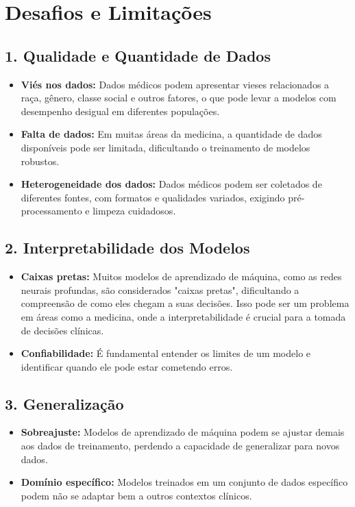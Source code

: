 \documentclass[12pt,a4paper,oneside,openany]{article}
\begin{document}
\section*{Desafios e Limitações}

\subsection*{1. Qualidade e Quantidade de Dados}
\begin{itemize}
    \item \textbf{Viés nos dados:} Dados médicos podem apresentar vieses relacionados a raça, gênero, classe social e outros fatores, o que pode levar a modelos com desempenho desigual em diferentes populações.
    \item \textbf{Falta de dados:} Em muitas áreas da medicina, a quantidade de dados disponíveis pode ser limitada, dificultando o treinamento de modelos robustos.
    \item \textbf{Heterogeneidade dos dados:} Dados médicos podem ser coletados de diferentes fontes, com formatos e qualidades variados, exigindo pré-processamento e limpeza cuidadosos.
\end{itemize}

\subsection*{2. Interpretabilidade dos Modelos}
\begin{itemize}
    \item \textbf{Caixas pretas:} Muitos modelos de aprendizado de máquina, como as redes neurais profundas, são considerados "caixas pretas", dificultando a compreensão de como eles chegam a suas decisões. Isso pode ser um problema em áreas como a medicina, onde a interpretabilidade é crucial para a tomada de decisões clínicas.
    \item \textbf{Confiabilidade:} É fundamental entender os limites de um modelo e identificar quando ele pode estar cometendo erros.
\end{itemize}

\subsection*{3. Generalização}
\begin{itemize}
    \item \textbf{Sobreajuste:} Modelos de aprendizado de máquina podem se ajustar demais aos dados de treinamento, perdendo a capacidade de generalizar para novos dados.
    \item \textbf{Domínio específico:} Modelos treinados em um conjunto de dados específico podem não se adaptar bem a outros contextos clínicos.
\end{itemize}
\end{document}
